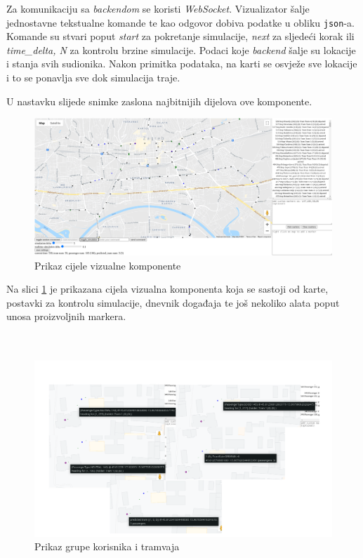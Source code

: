 \documentclass[times, utf8, diplomski]{fer}
\begin{document}
Za komunikaciju sa \emph{backendom} se koristi \emph{WebSocket}. Vizualizator šalje jednostavne tekstualne komande te kao odgovor dobiva podatke u obliku \texttt{json}-a. Komande su stvari poput \emph{start} za pokretanje simulacije, \emph{next} za sljedeći korak ili \emph{time\_delta, N} za kontrolu brzine simulacije. Podaci koje \emph{backend} šalje su lokacije i stanja svih sudionika. Nakon primitka podataka, na karti se osvježe sve lokacije i to se ponavlja sve dok simulacija traje.


U nastavku slijede snimke zaslona najbitnijih dijelova ove komponente.

\begin{figure}[htb]
    \centering
    \includegraphics[width=1\textwidth]{images/frontend_full.png}
    \caption{Prikaz cijele vizualne komponente}\label{fig:frontend_full}
\end{figure}

Na slici \ref{fig:frontend_full} je prikazana cijela vizualna komponenta koja se sastoji od karte, postavki za kontrolu simulacije, dnevnik događaja te još nekoliko alata poput unosa proizvoljnih markera.\\\\\\

\begin{figure}[htb]
    \centering
    \includegraphics[width=1\textwidth]{images/frontend_group_combined.png}
    \caption{Prikaz grupe korisnika i tramvaja}\label{fig:frontend_group_combined}
\end{figure}
\end{document}
